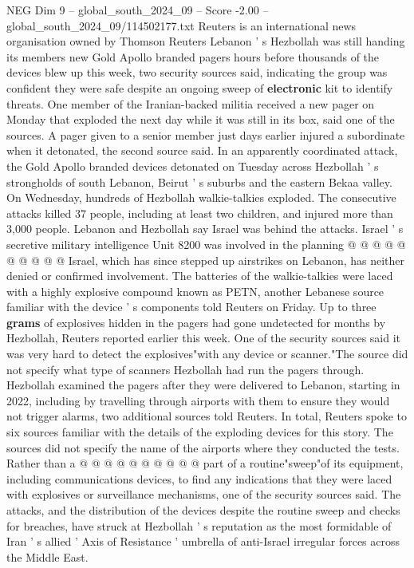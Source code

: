 \begin{textsample}{NEG Dim 9 – global\_south\_2024\_09 – Score -2.00 – global\_south\_2024\_09/114502177.txt}  \label{ex:f9_neg_203}
Reuters is an international news organisation owned by Thomson Reuters Lebanon ' s Hezbollah was still handing its members new Gold Apollo branded pagers hours before thousands of the devices blew up this week, two security sources said, indicating the group was confident they were safe despite an ongoing sweep of \textbf{electronic} kit to identify threats.
One member of the Iranian-backed militia received a new pager on Monday that exploded the next day while it was still in its box, said one of the sources.
A pager given to a senior member just days earlier injured a subordinate when it detonated, the second source said.
In an apparently coordinated attack, the Gold Apollo branded devices detonated on Tuesday across Hezbollah ' s strongholds of south Lebanon, Beirut ' s suburbs and the eastern Bekaa valley.
On Wednesday, hundreds of Hezbollah walkie-talkies exploded.
The consecutive attacks killed 37 people, including at least two children, and injured more than 3,000 people.
Lebanon and Hezbollah say Israel was behind the attacks.
Israel ' s secretive military intelligence Unit 8200 was involved in the planning @ @ @ @ @ @ @ @ @ @ Israel, which has since stepped up airstrikes on Lebanon, has neither denied or confirmed involvement.
The batteries of the walkie-talkies were laced with a highly explosive compound known as PETN, another Lebanese source familiar with the device ' s components told Reuters on Friday.
Up to three \textbf{grams} of explosives hidden in the pagers had gone undetected for months by Hezbollah, Reuters reported earlier this week.
One of the security sources said it was very hard to detect the explosives"with any device or scanner."The source did not specify what type of scanners Hezbollah had run the pagers through.
Hezbollah examined the pagers after they were delivered to Lebanon, starting in 2022, including by travelling through airports with them to ensure they would not trigger alarms, two additional sources told Reuters.
In total, Reuters spoke to six sources familiar with the details of the exploding devices for this story.
The sources did not specify the name of the airports where they conducted the tests.
Rather than a @ @ @ @ @ @ @ @ @ @ part of a routine"sweep"of its equipment, including communications devices, to find any indications that they were laced with explosives or surveillance mechanisms, one of the security sources said.
The attacks, and the distribution of the devices despite the routine sweep and checks for breaches, have struck at Hezbollah ' s reputation as the most formidable of Iran ' s allied ' Axis of Resistance ' umbrella of anti-Israel irregular forces across the Middle East.

\end{textsample}
